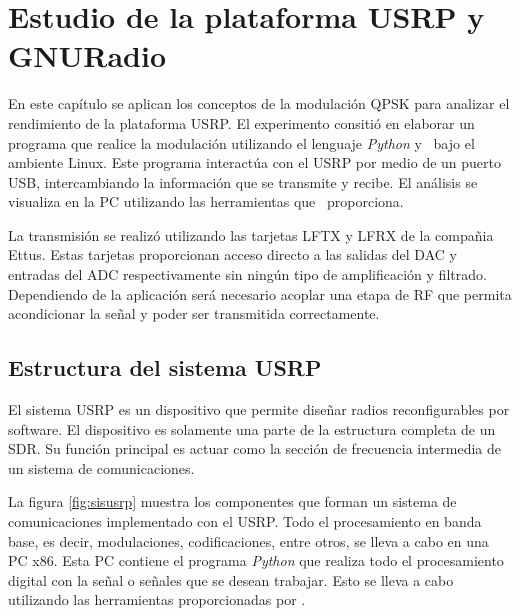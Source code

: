 \chapter{Estudio de la plataforma USRP y GNURadio}
\label{ch:estudio}

En este cap\'itulo se aplican los conceptos de la modulaci\'on QPSK para
analizar el rendimiento de la plataforma USRP. El experimento consiti\'o en elaborar
un programa que realice la modulaci\'on utilizando el lenguaje \emph{Python} y
\gnuradio\ bajo el ambiente Linux. Este programa interact\'ua con el USRP
por medio de un puerto USB, intercambiando la informaci\'on que se transmite y
recibe. El an\'alisis se visualiza en la PC utilizando las herramientas
que \gnuradio\ proporciona.

La transmisi\'on se realiz\'o utilizando las tarjetas LFTX y LFRX de la compa\~nia Ettus. Estas
tarjetas proporcionan acceso directo a las salidas del DAC y entradas del ADC
respectivamente sin ning\'un tipo de amplificaci\'on y filtrado. Dependiendo de la
aplicaci\'on ser\'a necesario acoplar una etapa de RF que permita acondicionar la
se\~nal y poder ser transmitida correctamente.

\section{Estructura del sistema USRP}

El sistema USRP es un dispositivo que permite dise\~nar radios reconfigurables
por software. El dispositivo es solamente una parte de la estructura completa de
un SDR. Su funci\'on principal es actuar como la secci\'on de frecuencia intermedia de un sistema de
comunicaciones.

La figura \ref{fig:sisusrp} muestra los componentes que forman un sistema de
comunicaciones implementado con el USRP. Todo el procesamiento en banda base, es decir,
modulaciones, codificaciones, entre otros, se lleva a cabo en una PC x86. Esta PC
contiene el programa \emph{Python} que realiza todo el procesamiento digital con la
se\~nal o se\~nales que se desean trabajar. Esto se lleva a cabo utilizando las
herramientas proporcionadas por \gnuradio.

